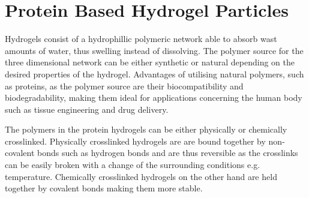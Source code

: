 \section{Protein Based Hydrogel Particles}
Hydrogels consist of a hydrophillic polymeric network able to absorb wast amounts of water, thus swelling instead of dissolving. The polymer source for the three dimensional network can be either synthetic or natural depending on the desired properties of the hydrogel. Advantages of utilising natural polymers, such as proteins, as the polymer source are their biocompatibility and biodegradability, making them ideal for applications concerning the human body such as tissue engineering and drug delivery.\parencite{Huerta-LópezCarla2021ProteinHydroTheSwiss, PanahiReza2019ProteinHydrogels} 
\par
%
The polymers in the protein hydrogels can be either physically or chemically crosslinked. Physically crosslinked hydrogels are are bound together by non-covalent bonds such as hydrogen bonds and are thus reversible as the crosslinks can be easily broken with a change of the surrounding conditions e.g. temperature. Chemically crosslinked hydrogels on the other hand are held together by covalent bonds making them more stable. \parencite{Huerta-LópezCarla2021ProteinHydroTheSwiss, PanahiReza2019ProteinHydrogels}
%
